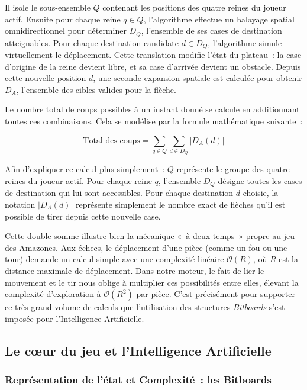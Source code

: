 \documentclass[a4paper]{article}
\begin{document}
Il isole le sous-ensemble $Q$ contenant les positions des quatre reines du joueur actif. Ensuite pour chaque reine $q \in Q$, l'algorithme effectue un balayage spatial omnidirectionnel pour déterminer $D_Q$, l'ensemble de ses cases de destination atteignables. Pour chaque destination candidate $d \in D_Q$, l'algorithme simule virtuellement le déplacement. Cette translation modifie l'état du plateau~: la case d'origine de la reine devient libre, et sa case d'arrivée devient un obstacle. Depuis cette nouvelle position $d$, une seconde expansion spatiale est calculée pour obtenir $D_A$, l'ensemble des cibles valides pour la flèche.

Le nombre total de coups possibles à un instant donné se calcule en additionnant toutes ces combinaisons. Cela se modélise par la formule mathématique suivante~:

$$ \text{Total des coups} = \sum_{q \in Q} \sum_{d \in D_Q} |D_A(d)| $$

Afin d'expliquer ce calcul plus simplement~:
    $Q$ représente le groupe des quatre reines du joueur actif.
    Pour chaque reine $q$, l'ensemble $D_Q$ désigne toutes les cases de destination qui lui sont accessibles.
    Pour chaque destination $d$ choisie, la notation $|D_A(d)|$ représente simplement le nombre exact de flèches qu'il est possible de tirer depuis cette nouvelle case.

Cette double somme illustre bien la mécanique «~à deux temps~» propre au jeu des Amazones. Aux échecs, le déplacement d'une pièce (comme un fou ou une tour) demande un calcul simple avec une complexité linéaire $\mathcal{O}(R)$, où $R$ est la distance maximale de déplacement. Dans notre moteur, le fait de lier le mouvement et le tir nous oblige à multiplier ces possibilités entre elles, élevant la complexité d'exploration à $\mathcal{O}(R^2)$ par pièce. C'est précisément pour supporter ce très grand volume de calculs que l'utilisation des structures \textit{Bitboards} s'est imposée pour l'Intelligence Artificielle.

\subsection{Le cœur du jeu et l'Intelligence Artificielle}
\label{sec:ai-alg-struct}

\subsubsection{Représentation de l'état et Complexité~: les Bitboards}
\end{document}
